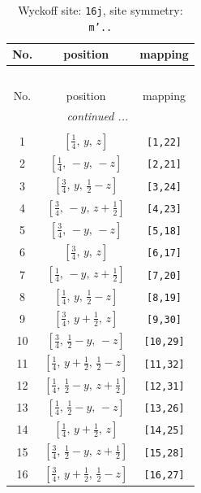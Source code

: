 \documentclass[fleqn,8pt]{jsarticle}
\begin{document}
\renewcommand{\arraystretch}{1.2}
\begin{longtable}{ccc}
\caption{Wyckoff site: {\tt 16j}, site symmetry: {\tt m'..}}
 \\
 \hline \hline
No. & position & mapping \\ \hline \endfirsthead

\multicolumn{2}{l}{\tablename\ \thetable{}} \\
 \hline \hline
No. & position & mapping \\ \hline \endhead

 \hline \hline
\multicolumn{2}{r}{\footnotesize\it continued ...} \\ \endfoot

 \hline \hline
\multicolumn{2}{r}{} \\ \endlastfoot

1 & $\left[ \frac{1}{4},\, y,\, z \right]$ & {\tt [1,22]} \\ \hline
2 & $\left[ \frac{1}{4},\, - y,\, - z \right]$ & {\tt [2,21]} \\ \hline
3 & $\left[ \frac{3}{4},\, y,\, \frac{1}{2} - z \right]$ & {\tt [3,24]} \\ \hline
4 & $\left[ \frac{3}{4},\, - y,\, z + \frac{1}{2} \right]$ & {\tt [4,23]} \\ \hline
5 & $\left[ \frac{3}{4},\, - y,\, - z \right]$ & {\tt [5,18]} \\ \hline
6 & $\left[ \frac{3}{4},\, y,\, z \right]$ & {\tt [6,17]} \\ \hline
7 & $\left[ \frac{1}{4},\, - y,\, z + \frac{1}{2} \right]$ & {\tt [7,20]} \\ \hline
8 & $\left[ \frac{1}{4},\, y,\, \frac{1}{2} - z \right]$ & {\tt [8,19]} \\ \hline
9 & $\left[ \frac{3}{4},\, y + \frac{1}{2},\, z \right]$ & {\tt [9,30]} \\ \hline
10 & $\left[ \frac{3}{4},\, \frac{1}{2} - y,\, - z \right]$ & {\tt [10,29]} \\ \hline
11 & $\left[ \frac{1}{4},\, y + \frac{1}{2},\, \frac{1}{2} - z \right]$ & {\tt [11,32]} \\ \hline
12 & $\left[ \frac{1}{4},\, \frac{1}{2} - y,\, z + \frac{1}{2} \right]$ & {\tt [12,31]} \\ \hline
13 & $\left[ \frac{1}{4},\, \frac{1}{2} - y,\, - z \right]$ & {\tt [13,26]} \\ \hline
14 & $\left[ \frac{1}{4},\, y + \frac{1}{2},\, z \right]$ & {\tt [14,25]} \\ \hline
15 & $\left[ \frac{3}{4},\, \frac{1}{2} - y,\, z + \frac{1}{2} \right]$ & {\tt [15,28]} \\ \hline
16 & $\left[ \frac{3}{4},\, y + \frac{1}{2},\, \frac{1}{2} - z \right]$ & {\tt [16,27]} \\
\end{longtable}
\end{document}
